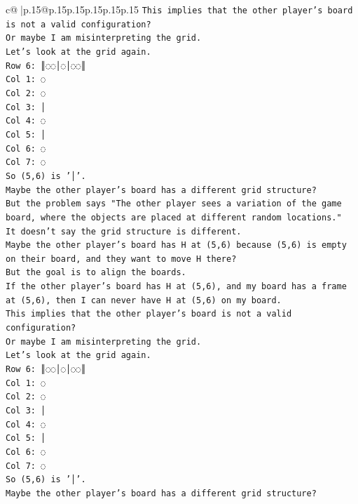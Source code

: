 \documentclass{article}
\begin{document}
{\begin{supertabular}{c@{$\;$}|p{.15\linewidth}@{}p{.15\linewidth}p{.15\linewidth}p{.15\linewidth}p{.15\linewidth}p{.15\linewidth}}
{{{\texttt{This implies that the other player's board is not a valid configuration?} \\
\texttt{Or maybe I am misinterpreting the grid.} \\
\texttt{Let's look at the grid again.} \\
\texttt{Row 6: ║◌◌│◌│◌◌║} \\
\texttt{Col 1: ◌} \\
\texttt{Col 2: ◌} \\
\texttt{Col 3: │} \\
\texttt{Col 4: ◌} \\
\texttt{Col 5: │} \\
\texttt{Col 6: ◌} \\
\texttt{Col 7: ◌} \\
\texttt{So (5,6) is '│'.} \\
\texttt{Maybe the other player's board has a different grid structure?} \\
\texttt{But the problem says "The other player sees a variation of the game board, where the objects are placed at different random locations."} \\
\texttt{It doesn't say the grid structure is different.} \\
\texttt{Maybe the other player's board has H at (5,6) because (5,6) is empty on their board, and they want to move H there?} \\
\texttt{But the goal is to align the boards.} \\
\texttt{If the other player's board has H at (5,6), and my board has a frame at (5,6), then I can never have H at (5,6) on my board.} \\
\texttt{This implies that the other player's board is not a valid configuration?} \\
\texttt{Or maybe I am misinterpreting the grid.} \\
\texttt{Let's look at the grid again.} \\
\texttt{Row 6: ║◌◌│◌│◌◌║} \\
\texttt{Col 1: ◌} \\
\texttt{Col 2: ◌} \\
\texttt{Col 3: │} \\
\texttt{Col 4: ◌} \\
\texttt{Col 5: │} \\
\texttt{Col 6: ◌} \\
\texttt{Col 7: ◌} \\
\texttt{So (5,6) is '│'.} \\
\texttt{Maybe the other player's board has a different grid structure?} \\
}}}
\end{supertabular}}
\end{document}
